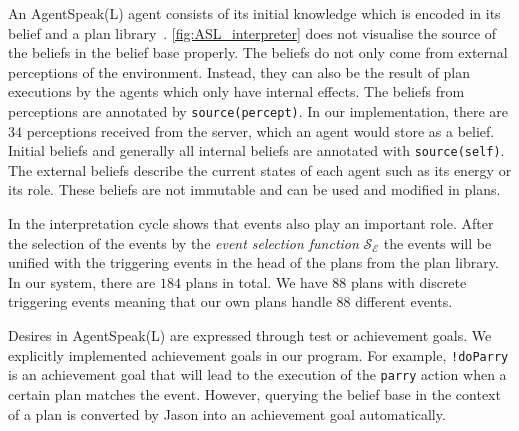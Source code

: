 An AgentSpeak(L) agent consists of its initial knowledge which is encoded in its belief and a plan library~\cite{rafael_BDIAgent_2005}.
\autoref{fig:ASL_interpreter} does not visualise the source of the beliefs in the belief base properly.
The beliefs do not only come from external perceptions of the environment. %
Instead, they can also be the result of plan executions by the agents which only have internal effects.
The beliefs from perceptions are annotated by \texttt{source(percept)}.
In our implementation, there are $34$ perceptions received from the server, which an agent would store as a belief.
Initial beliefs and generally all internal beliefs are annotated with \texttt{source(self)}.
The external beliefs describe the current states of each agent such as its energy or its role.
These beliefs are not immutable and can be used and modified in plans.

In the interpretation cycle shows that events also play an important role.
After the selection of the events by the \emph{event selection function} $\mathcal{S_E}$ the events will be unified with the triggering events in the head of the plans from the plan library.
In our system, there are $184$ plans in total.
We have $88$ plans with discrete triggering events meaning that our own plans handle $88$ different events.

Desires in AgentSpeak(L) are expressed through test or achievement goals.
We explicitly implemented achievement goals in our program.
For example, \texttt{!doParry} is an achievement goal that will lead to the execution of the \texttt{parry} action when a certain plan matches the event.
However, querying the belief base in the context of a plan is converted by Jason into an achievement goal automatically.

